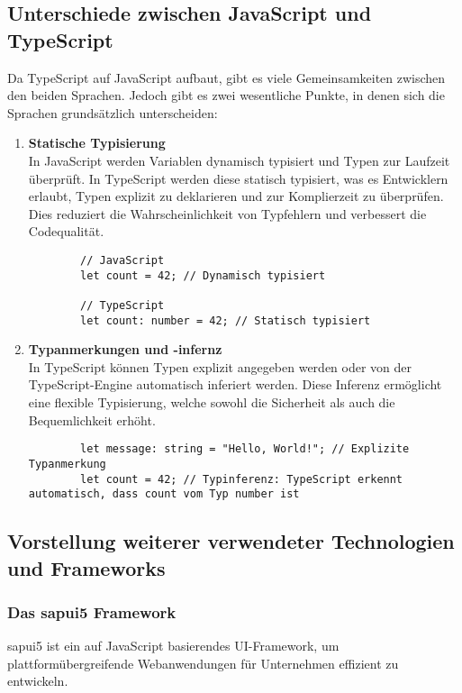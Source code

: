 \subsection[Unterschiede zwischen JavaScript und TypeScript]{Unterschiede zwischen JavaScript und TypeScript}
Da TypeScript auf JavaScript aufbaut, gibt es viele Gemeinsamkeiten zwischen den beiden Sprachen.
Jedoch gibt es zwei wesentliche Punkte, in denen sich die Sprachen grundsätzlich unterscheiden:

\begin{enumerate}
    \item \textbf{Statische Typisierung} \\
    In JavaScript werden Variablen dynamisch typisiert und Typen zur Laufzeit überprüft. In TypeScript werden diese statisch typisiert, was es Entwicklern erlaubt, Typen explizit zu deklarieren und zur Komplierzeit zu überprüfen.
    Dies reduziert die Wahrscheinlichkeit von Typfehlern und verbessert die Codequalität.
    \begin{lstlisting}
        // JavaScript
        let count = 42; // Dynamisch typisiert

        // TypeScript
        let count: number = 42; // Statisch typisiert
    \end{lstlisting}
    \item \textbf{Typanmerkungen und -infernz} \\
    In TypeScript können Typen explizit angegeben werden oder von der TypeScript-Engine automatisch inferiert werden.
    Diese Inferenz ermöglicht eine flexible Typisierung, welche sowohl die Sicherheit als auch die Bequemlichkeit erhöht.
    \begin{lstlisting}
        let message: string = "Hello, World!"; // Explizite Typanmerkung
        let count = 42; // Typinferenz: TypeScript erkennt automatisch, dass count vom Typ number ist
    \end{lstlisting}
\end{enumerate}

\subsection[Vorstellung weiterer verwendeter Technologien und Frameworks]{Vorstellung weiterer verwendeter Technologien und Frameworks}

\subsubsection[Das \gls{sapui5} Framework]{Das \gls{sapui5} Framework}
\gls{sapui5} ist ein auf JavaScript basierendes UI-Framework, um plattformübergreifende Webanwendungen für Unternehmen effizient zu entwickeln.


